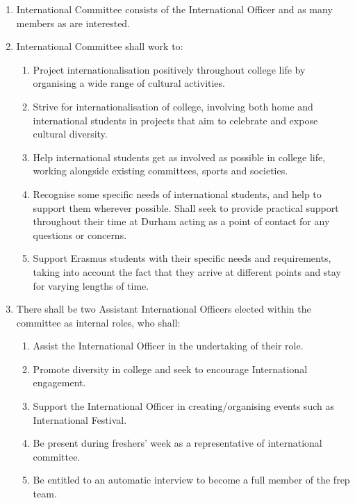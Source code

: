 \begin{enumerate}
    \item International Committee consists of the International Officer and as many members as are interested.
    \item International Committee shall work to:
    \begin{enumerate}
        \item Project internationalisation positively throughout college life by organising a wide range of cultural activities.
        \item Strive for internationalisation of college, involving both home and international students in projects that aim to celebrate and expose cultural diversity.
        \item Help international students get as involved as possible in college life, working alongside existing committees, sports and societies.
        \item Recognise some specific needs of international students, and help to support them wherever possible. Shall seek to provide practical support throughout their time at Durham acting as a point of contact for any questions or concerns.
        \item Support Erasmus students with their specific needs and requirements, taking into account the fact that they arrive at different points and stay for varying lengths of time.
    \end{enumerate}
    \item There shall be two Assistant International Officers elected within the committee as internal roles, who shall:
    \begin{enumerate}
        \item Assist the International Officer in the undertaking of their role.
        \item Promote diversity in college and seek to encourage International engagement.
        \item Support the International Officer in creating/organising events such as International Festival.
        \item Be present during freshers’ week as a representative of international committee. 
        \item Be entitled to an automatic interview to become a full member of the frep team.
    \end{enumerate}
\end{enumerate}


